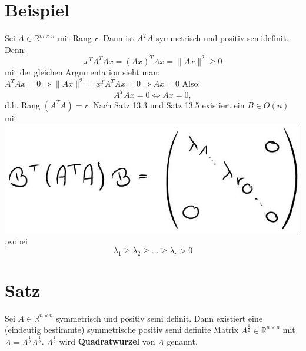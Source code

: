 \documentclass{scrbook}
\begin{document}
\section{Beispiel}
Sei $A\in \mathbb{R} ^{m \times n}$ mit Rang $r$. Dann ist $A^TA$ symmetrisch und positiv semidefinit. Denn:
\[x^TA^TAx = (Ax)^TAx = \|Ax\|^2 \geq 0\]
mit der gleichen Argumentation sieht man:
$A^TAx = 0 \Rightarrow \|Ax\|^2 = x^TA^TAx = 0 \Rightarrow Ax = 0$
Also:
\[A^TAx = 0 \Leftrightarrow Ax=0,\]
d.h. Rang $(A^TA) = r$. Nach Satz 13.3 und Satz 13.5 existiert ein $B\in O(n)$ mit 
\includegraphics{Beispiel_13_6_1.jpeg}
,wobei
\[\lambda_1 \geq \lambda_2 \geq ... \geq \lambda_r > 0\]
\section{Satz}
Sei $A \in \mathbb{R}^{n \times n}$ symmetrisch und positiv semi definit. Dann existiert eine (eindeutig bestimmte) symmetrische positiv semi definite Matrix $A^{\frac{1}{2}} \in \mathbb{R}^{n\times n}$ mit $A = A^{\frac{1}{2}} A^{\frac{1}{2}}$. $A^{\frac{1}{2}}$ wird \textbf{Quadratwurzel} von $A$ genannt.
\end{document}
